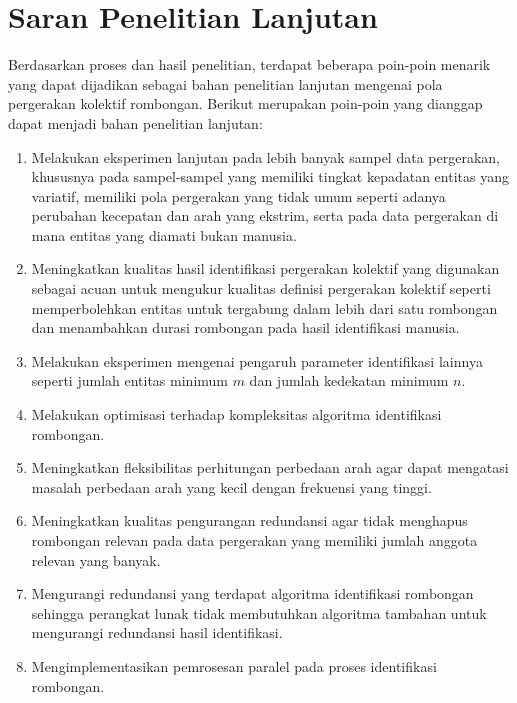 \section{Saran Penelitian Lanjutan}
\label{sec:saran}

Berdasarkan proses dan hasil penelitian, terdapat beberapa poin-poin menarik yang dapat dijadikan sebagai bahan penelitian lanjutan mengenai pola pergerakan kolektif rombongan. Berikut merupakan poin-poin yang dianggap dapat menjadi bahan penelitian lanjutan:

\begin{enumerate}
    \item Melakukan eksperimen lanjutan pada lebih banyak sampel data pergerakan, khususnya pada sampel-sampel yang memiliki tingkat kepadatan entitas yang variatif, memiliki pola pergerakan yang tidak umum seperti adanya perubahan kecepatan dan arah yang ekstrim, serta pada data pergerakan di mana entitas yang diamati bukan manusia.
    \item Meningkatkan kualitas hasil identifikasi pergerakan kolektif yang digunakan sebagai acuan untuk mengukur kualitas definisi pergerakan kolektif seperti memperbolehkan entitas untuk tergabung dalam lebih dari satu rombongan dan menambahkan durasi rombongan pada hasil identifikasi manusia.
    \item Melakukan eksperimen mengenai pengaruh parameter identifikasi lainnya seperti jumlah entitas minimum $m$ dan jumlah kedekatan minimum $n$.
    \item Melakukan optimisasi terhadap kompleksitas algoritma identifikasi rombongan.
    \item Meningkatkan fleksibilitas perhitungan perbedaan arah agar dapat mengatasi masalah perbedaan arah yang kecil dengan frekuensi yang tinggi.
    \item Meningkatkan kualitas pengurangan redundansi agar tidak menghapus rombongan relevan pada data pergerakan yang memiliki jumlah anggota relevan yang banyak.
    \item Mengurangi redundansi yang terdapat algoritma identifikasi rombongan sehingga perangkat lunak tidak membutuhkan algoritma tambahan untuk mengurangi redundansi hasil identifikasi.
    \item Mengimplementasikan pemrosesan paralel pada proses identifikasi rombongan.
\end{enumerate}